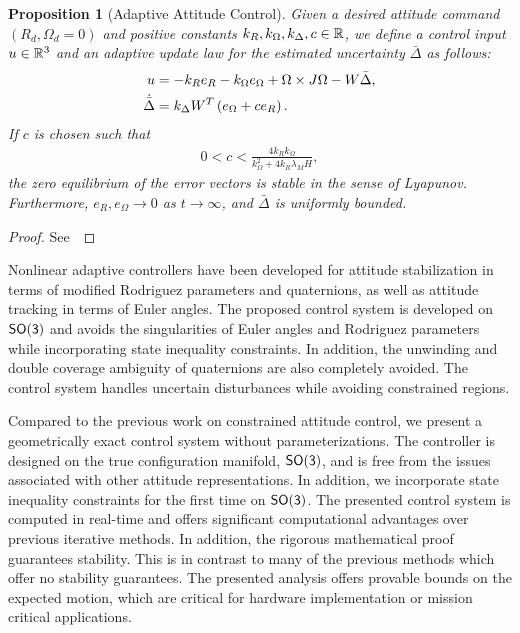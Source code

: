 \documentclass[fleqn]{IJCAS}  %
\newtheorem{prop}{Proposition}
\begin{document}
\begin{multicols}{2}
\begin{prop}[Adaptive Attitude Control]\label{prop:adaptive_control}
Given  a desired attitude command \( (R_d, \Omega_d = 0 )\) and positive constants \( k_R, k_\Omega, k_\Delta, c \in \mathbb{R} \), we define a control input \( u \in \mathbb{R}^3\) and an adaptive update law for the estimated uncertainty \( \bar{\Delta} \) as follows:
\begin{align}
	u &= - k_R e_R - k_\Omega e_\Omega + \Omega \times J \Omega - W \bar{\Delta} , \label{eqn:adaptive_control} \\
	\dot{\bar{\Delta}} &= k_\Delta W^T \left( e_\Omega + c e_R \right) . \label{eqn:delta_dot}
\end{align}
If \( c \) is chosen such that
\begin{gather}
	0 < c < \frac{4 k_R k_\Omega}{k_\Omega^2 + 4 k_R \lambda_M H} , \label{eqn:c_bound}
\end{gather}
  the zero equilibrium of the error vectors is stable in the sense of Lyapunov. Furthermore, $e_R,e_\Omega\rightarrow 0$ as $t\rightarrow\infty$, and $\bar\Delta$ is uniformly bounded.
\end{prop}
\begin{proof}
See~
\end{proof}

Nonlinear adaptive controllers have been developed for attitude stabilization in terms of modified Rodriguez parameters and quaternions, as well as attitude tracking in terms of Euler angles. 
The proposed control system is developed on \(\mathsf{SO(3)}\) and avoids the singularities of Euler angles and Rodriguez parameters while incorporating state inequality constraints. 
In addition, the unwinding and double coverage ambiguity of quaternions are also completely avoided. 
The control system handles uncertain disturbances while avoiding constrained regions.

Compared to the previous work on constrained attitude control, we present a geometrically exact control system without parameterizations.
The controller is designed on the true configuration manifold, \( \mathsf{SO(3)} \), and is free from the issues associated with other attitude representations.
In addition, we incorporate state inequality constraints for the first time on \( \mathsf{SO(3)} \).
The presented control system is computed in real-time and offers significant computational advantages over previous iterative methods. 
In addition, the rigorous mathematical proof guarantees stability.
This is in contrast to many of the previous methods which offer no stability guarantees.
The presented analysis offers provable bounds on the expected motion, which are critical for hardware implementation or mission critical applications.


\end{multicols}
\end{document}
